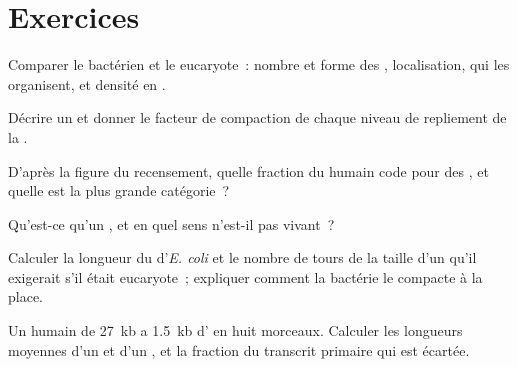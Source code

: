 \section{Exercices}

\begin{exercise}[$\star$]\label{exo:b1:genomes:1}
Comparer le  bactérien et le  eucaryote~: nombre et forme
des , localisation,  qui les organisent, et densité
en .
\end{exercise}

\begin{exercise}[$\star$]\label{exo:b1:genomes:2}
Décrire un  et donner le facteur de compaction de chaque
niveau de repliement de la .
\end{exercise}

\begin{exercise}[$\star$]\label{exo:b1:genomes:3}
D'après la figure du recensement, quelle fraction du  humain code
pour des , et quelle est la plus grande catégorie~?
\end{exercise}

\begin{exercise}[$\star$]\label{exo:b1:genomes:4}
Qu'est-ce qu'un , et en quel sens n'est-il pas vivant~?
\end{exercise}

\begin{exercise}[$\star\star$]\label{exo:b1:genomes:5}
Calculer la longueur du  d'\emph{E. coli} et le nombre de
tours de la taille d'un  qu'il exigerait s'il était
eucaryote~; expliquer comment la bactérie le compacte à la place.
\end{exercise}

\begin{exercise}[$\star\star$]\label{exo:b1:genomes:6}
Un  humain de \qty{27}{kb} a \qty{1.5}{kb} d' en huit
morceaux. Calculer les longueurs moyennes d'un  et d'un , et
la fraction du transcrit primaire qui est écartée.
\end{exercise}

